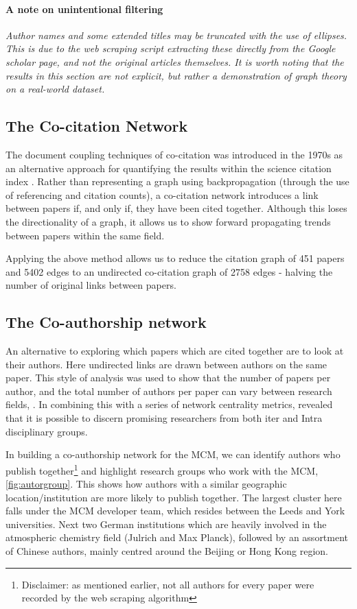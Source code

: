 \paragraph*{A note on unintentional filtering}

\textit{
Author names and some extended titles may be truncated with the use of ellipses. This is due to the web scraping script extracting these directly from the Google scholar page, and not the original articles themselves. It is worth noting that the results in this section are not explicit, but rather a demonstration of graph theory on a real-world dataset.
}


\subsection{The Co-citation Network}\label{sec:cocitep}

The document coupling techniques of co-citation was introduced in the 1970s as an alternative approach for quantifying the results within the science citation index \citep{cocite}. Rather than representing a graph using backpropagation (through the use of referencing and citation counts), a co-citation network introduces a link between papers if, and only if, they have been cited together. Although this loses the directionality of a graph, it allows us to show forward propagating trends between papers within the same field. 

Applying the above method allows us to reduce the citation graph of 451 papers and 5402 edges to an undirected co-citation graph of 2758 edges - halving the number of original links between papers. 

\subsection{The Co-authorship network}
An alternative to exploring which papers which are cited together are to look at their authors. Here undirected links are drawn between authors on the same paper. This style of analysis was used to show that the number of papers per author, and the total number of authors per paper can vary between research fields, \citep{newmancoauthor}. In combining this with a series of network centrality metrics, \citep{coauthornew} revealed that it is possible to discern promising researchers from both iter and Intra disciplinary groups. 

In building a co-authorship network for the MCM, we can identify authors who publish together\footnote{ Disclaimer: as mentioned earlier, not all authors for every paper were recorded by the web scraping algorithm} and highlight research groups who work with the MCM, \autoref{fig:autorgroup}. This shows how authors with a similar geographic location/institution are more likely to publish together. The largest cluster here falls under the MCM developer team, which resides between the Leeds and York universities. Next two German institutions which are heavily involved in the atmospheric chemistry field (Julrich and Max Planck), followed by an assortment of Chinese authors, mainly centred around the Beijing or Hong Kong region. 



